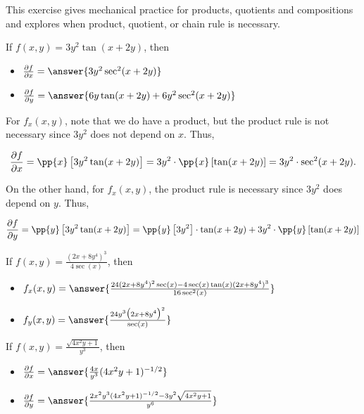 \documentclass{ximera}
\author{Jim Talamo}
\newcommand{\Pp}[2]{\frac{\partial #1}{\partial #2}}
\begin{document}
This exercise gives mechanical practice for products, quotients and compositions and explores when product, quotient, or chain rule is necessary.


\begin{exercise}
If $f(x,y) = 3y^2 \tan(x+2y)$, then 

\begin{itemize}
\item $\Pp{f}{x} = \answer{3y^2\sec^2(x+2y)}$
\item $\Pp{f}{y} = \answer{6y \tan(x+2y) + 6y^2 \sec^2(x+2y)}$
\end{itemize}

\begin{hint}
For $f_x(x,y)$, note that we do have a product, but the product rule is not necessary since $3y^2$ does not depend on $x$.  Thus,

\[
\Pp{f}{x} = \pp{x} \left[ 3y^2 \tan(x+2y) \right] = 3y^2 \cdot \pp{x} \left[ \tan(x+2y) \right] = 3y^2  \cdot \sec^2(x+2y) .
\]

On the other hand, for $f_x(x,y)$, the product rule is necessary since $3y^2$ does depend on $y$.  Thus,

\[
\Pp{f}{y} = \pp{y} \left[ 3y^2 \tan(x+2y) \right] =   \pp{y}  \left[ 3y^2 \right]  \cdot \tan(x+2y)+ 3y^2 \cdot \pp{y} \left[ \tan(x+2y) \right] 
\]
\end{hint}
\end{exercise}


\begin{exercise}
If $f(x,y) = \frac{(2x+8y^4)^3}{4\sec(x)}$, then 

\begin{itemize}
\item $f_x(x,y) = \answer{\frac{24(2x+8y^4)^2 \sec(x) - 4\sec(x)\tan(x) (2x+8y^4)^3}{16 \sec^2(x)}  }$
\item $f_y(x,y) = \answer{\frac{24y^3 \big(2x+8y^4\big)^2}{\sec(x)}}$
\end{itemize}


\end{exercise}


\begin{exercise}
If $f(x,y) = \frac{\sqrt{4x^2y+1}}{y^3}$, then 

\begin{itemize}
\item $\Pp{f}{x} = \answer{\frac{4x}{y^3} (4x^2y+1)^{-1/2} }$
\item $\Pp{f}{y} = \answer{\frac{2x^2y^3 (4x^2y+1)^{-1/2} - 3y^2\sqrt{4x^2y+1}}{y^6} }$
\end{itemize}


\end{exercise}
\end{document}
